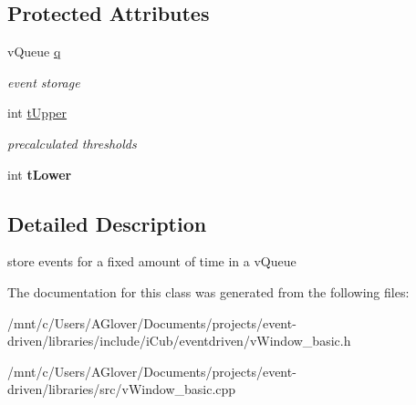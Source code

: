 \subsection*{Protected Attributes}
\begin{DoxyCompactItemize}
\item 
\mbox{\label{classev_1_1vTempWindow_abed022ad51f68443a2350fbeabbb4233}} 
v\+Queue \hyperlink{classev_1_1vTempWindow_abed022ad51f68443a2350fbeabbb4233}{q}
\begin{DoxyCompactList}\small\item\em event storage \end{DoxyCompactList}\item 
\mbox{\label{classev_1_1vTempWindow_a909a8f6df0014d1f318c6209223f5fad}} 
int \hyperlink{classev_1_1vTempWindow_a909a8f6df0014d1f318c6209223f5fad}{t\+Upper}
\begin{DoxyCompactList}\small\item\em precalculated thresholds \end{DoxyCompactList}\item 
\mbox{\label{classev_1_1vTempWindow_a47845a9e47b73598e2a325c06e994bed}} 
int {\bfseries t\+Lower}
\end{DoxyCompactItemize}


\subsection{Detailed Description}
store events for a fixed amount of time in a v\+Queue 

The documentation for this class was generated from the following files\+:\begin{DoxyCompactItemize}
\item 
/mnt/c/\+Users/\+A\+Glover/\+Documents/projects/event-\/driven/libraries/include/i\+Cub/eventdriven/v\+Window\+\_\+basic.\+h\item 
/mnt/c/\+Users/\+A\+Glover/\+Documents/projects/event-\/driven/libraries/src/v\+Window\+\_\+basic.\+cpp\end{DoxyCompactItemize}
